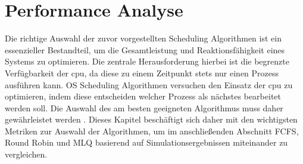 \chapter{Performance Analyse}
Die richtige Auswahl der zuvor vorgestellten Scheduling Algorithmen ist ein essenzieller Bestandteil, um die Gesamtleistung und Reaktionsfähigkeit eines Systems zu optimieren. Die zentrale Herausforderung hierbei ist die begrenzte Verfügbarkeit der \ac{cpu}, da diese zu einem Zeitpunkt stets nur einen Prozess ausführen kann. \ac{OS} Scheduling Algorithmen versuchen den Einsatz der \ac{cpu} zu optimieren, indem diese entscheiden welcher Prozess als nächstes bearbeitet werden soll. Die Auswahl des am besten geeigneten Algorithmus muss daher gewährleistet werden \autocite{goel_comparative_2013}. Dieses Kapitel beschäftigt sich daher mit den wichtigsten Metriken zur Auswahl der Algorithmen, um im anschließenden Abschnitt \ac{FCFS}, Round Robin und \ac{MLQ} basierend auf Simulationsergebnissen miteinander zu vergleichen.